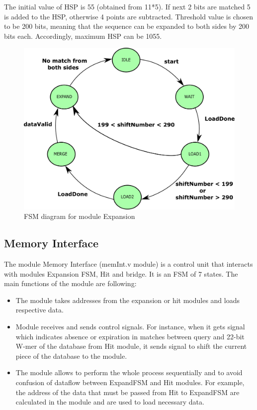 The initial value of HSP is 55 (obtained from 11*5). If next 2 bits are matched 5 is added to the HSP, otherwise 4 points are subtracted. Threshold value is chosen to be 200 bits, meaning that the sequence can be expanded to both sides by 200 bits each. Accordingly, maximum HSP can be 1055. 
       

\begin{figure}[t!]
\centering
\includegraphics[width=\columnwidth]{Figures/expandFSM.pdf}
\caption{FSM diagram for module Expansion} \label{fig:expandFSM}
\end{figure}
       
       
\subsection{Memory Interface}
\quad The module Memory Interface (memInt.v module) is a control unit that interacts with modules Expansion FSM, Hit and bridge. It is an FSM of 7 states. The main functions of the module are following:
\begin{itemize}
\item The module takes addresses from the expansion or hit modules and loads respective data.
\item Module receives and sends control signals. For instance, when it gets signal which indicates absence or expiration in matches between query and 22-bit W-mer of the database from Hit module, it sends signal to shift the current piece of the database to the module.
\item The module allows to perform the whole process sequentially and to avoid confusion of dataflow between ExpandFSM and Hit modules. For example, the address of the data that must be passed from Hit to ExpandFSM are calculated in the module and are used to load necessary data.
\end{itemize}

